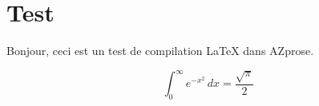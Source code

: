 \documentclass{article}
\begin{document}
\section{Test}
Bonjour, ceci est un test de compilation LaTeX dans AZprose.

\[
  \int_0^\infty e^{-x^2}\,dx = \frac{\sqrt{\pi}}{2}
\]
\end{document}
